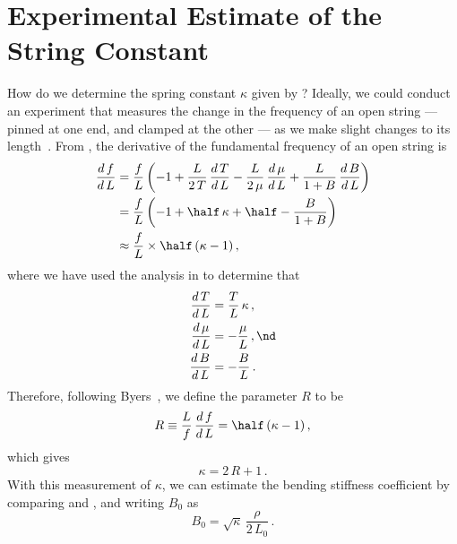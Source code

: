 %
%
%

 \section{Experimental Estimate of the String Constant\label{sct:exp}}

How do we determine the spring constant $\kappa$ given by ? Ideally, we could conduct an experiment that measures the change in the frequency of an open string --- pinned at one end, and clamped at the other --- as we make slight changes to its length~\cite{ref:byers1996cgi,ref:varieschi2010icf}. From , the derivative of the fundamental frequency of an open string is
 \begin{equation}
 \begin{split}
\frac{d\, f}{d\, L} &= \frac{f}{L} \left( -1 + \frac{L}{2\, T}\, \frac{d\, T}{d\, L} - \frac{L}{2\, \mu}\, \frac{d\, \mu}{d\, L} + \frac{L}{1 + B}\, \frac{d\, B}{d\, L} \right) \\
&= \frac{f}{L} \left( -1 + \half\, \kappa + \half - \frac{B}{1 + B} \right) \\
&\approx \frac{f}{L} \times \half\, (\kappa - 1)\, ,
 \end{split}
 \end{equation}
where we have used the analysis in  to determine that
 \begin{subequations}
 \begin{align}
\frac{d\, T}{d\, L} &= \frac{T}{L}\, \kappa\, , \\
\frac{d\, \mu}{d\, L} &= -\frac{\mu}{L}\, , \nd \\
\frac{d\, B}{d\, L} &= -\frac{B}{L}\, . \\
 \end{align}
 \end{subequations}
Therefore, following Byers~\cite{ref:byers1996cgi,ref:varieschi2010icf}, we define the parameter $R$ to be
 \begin{equation}\label{eqn:r_def}
R \equiv \frac{L}{f}\, \frac{d\, f}{d\, L} = \half\, (\kappa - 1)\, ,
 \end{equation}
which gives
 \begin{equation} \label{eqn:kappa_r}
\kappa = 2\, R + 1\, .
 \end{equation}
With this measurement of $\kappa$, we can estimate the bending stiffness coefficient by comparing  and , and writing $B_0$ as
 \begin{equation} \label{eqn:b_0_kappa}
B_0 = \sqrt{\kappa}\, \frac{\rho}{2\, L_0}\, .
 \end{equation}

